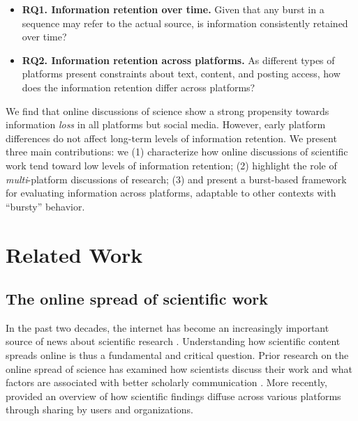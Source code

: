 \documentclass[letterpaper]{article} %
\begin{document}
\begin{itemize}
\item %
\textbf{RQ1. Information retention over time.} Given that any burst in a sequence may refer to the actual source, is information consistently retained over time?
\item %
\textbf{RQ2. Information retention across platforms.} As different types of platforms present constraints about text, content, and posting access, how does the information retention differ across platforms?
\end{itemize}

We find that online discussions of science show a strong propensity towards information \textit{loss} in all platforms but social media. However, early platform differences do not affect long-term levels of information retention.
We present three main contributions: we (1) characterize how online discussions of scientific work tend toward low levels of information retention; (2) highlight the role of \textit{multi}-platform discussions of research; (3) and present a burst-based framework for evaluating information across platforms, adaptable to other contexts with ``bursty'' behavior.

\section{Related Work}
\subsection{The online spread of scientific work}
In the past two decades, the internet has become an increasingly important source of news about scientific research \citep{brossardNewMediaLandscapes2013,vaneperenHowScientistsUse2011,hargittaiHowYoungAdults2018,nationalscienceboardScienceTechnologyPublic2020}. %
Understanding how scientific content spreads online is thus a fundamental and critical question. Prior research on the online spread of science has examined how scientists discuss their work \cite{robinson-garciaUnbearableEmptinessTweeting2017,reinhardtHowPeopleAre2009} and what factors are associated with better scholarly communication \citep{milkmanScienceSharingSharing2014}. More recently, \citet{zakhlebinDiffusionScientificArticles2020} provided an overview of how scientific findings diffuse across various platforms through sharing by users and organizations.
\end{document}
